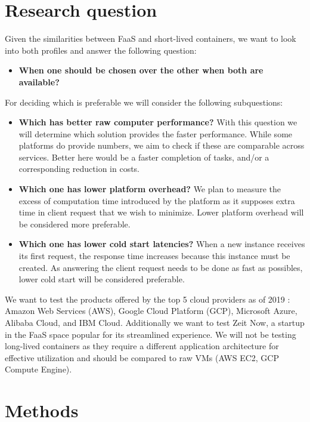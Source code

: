 \documentclass[11pt]{article}
\begin{document}
\section{Research question}
Given the similarities between FaaS and short-lived containers, we want to look into both profiles and answer the following question:

\begin{itemize}
\item \textbf{When one should be chosen over the other when both are available?}
\end{itemize}

For deciding which is preferable we will consider the following subquestions:

\begin{itemize}
\item \textbf{Which has better raw computer performance?} With this question we will determine which solution provides the faster performance. While some platforms do provide numbers, we aim to check if these are comparable across services. Better here would be a faster completion of tasks, and/or a corresponding reduction in costs.

\item \textbf{Which one has lower platform overhead?}  We plan to measure the excess of computation time introduced by the platform as it supposes extra time in client request that we wish to minimize. Lower platform overhead will be considered more preferable.

\item \textbf{Which one has lower cold start latencies?} When a new instance receives its first request, the response time increases because this instance must be created. As answering the client request needs to be done as fast as possibles, lower cold start will be considered preferable.
\end{itemize}


We want to test the products offered by the top 5 cloud providers as of 2019 \cite{hh}: Amazon Web Services (AWS), Google Cloud Platform (GCP), Microsoft Azure, Alibaba Cloud, and IBM Cloud. Additionally we want to test Zeit Now, a startup in the FaaS space popular for its streamlined experience. We will not be testing long-lived containers as they require a different application architecture for effective utilization and should be compared to raw VMs (AWS EC2, GCP Compute Engine).


\section{Methods}
\label{methods}
\end{document}
